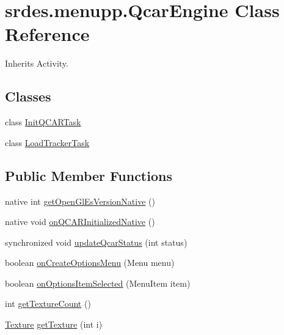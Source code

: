 \hypertarget{classsrdes_1_1menupp_1_1_qcar_engine}{\section{srdes.\-menupp.\-Qcar\-Engine \-Class \-Reference}
\label{classsrdes_1_1menupp_1_1_qcar_engine}
}


\-Inherits \-Activity.

\subsection*{\-Classes}
\begin{DoxyCompactItemize}
\item 
class \hyperlink{classsrdes_1_1menupp_1_1_qcar_engine_1_1_init_q_c_a_r_task}{\-Init\-Q\-C\-A\-R\-Task}
\item 
class \hyperlink{classsrdes_1_1menupp_1_1_qcar_engine_1_1_load_tracker_task}{\-Load\-Tracker\-Task}
\end{DoxyCompactItemize}
\subsection*{\-Public \-Member \-Functions}
\begin{DoxyCompactItemize}
\item 
native int \hyperlink{classsrdes_1_1menupp_1_1_qcar_engine_ae32972a9d037a8314efa5d9b10f91322}{get\-Open\-Gl\-Es\-Version\-Native} ()
\item 
native void \hyperlink{classsrdes_1_1menupp_1_1_qcar_engine_a7d7f6c6ffc71b592bd029510e17e2827}{on\-Q\-C\-A\-R\-Initialized\-Native} ()
\item 
synchronized void \hyperlink{classsrdes_1_1menupp_1_1_qcar_engine_ae47475c217413bc1377a6d6568132650}{update\-Qcar\-Status} (int status)
\item 
boolean \hyperlink{classsrdes_1_1menupp_1_1_qcar_engine_ae76faa2f48fbeb55adc43cb7b82d65c3}{on\-Create\-Options\-Menu} (\-Menu menu)
\item 
boolean \hyperlink{classsrdes_1_1menupp_1_1_qcar_engine_add28d14757941c02e895e8eda97f1d3d}{on\-Options\-Item\-Selected} (\-Menu\-Item item)
\item 
int \hyperlink{classsrdes_1_1menupp_1_1_qcar_engine_ae3b353842ddd6f7ba48dec17ef1e0c54}{get\-Texture\-Count} ()
\item 
\hyperlink{classsrdes_1_1menupp_1_1_texture}{\-Texture} \hyperlink{classsrdes_1_1menupp_1_1_qcar_engine_ad567808a0037e506d5574f0ab9fc41cc}{get\-Texture} (int i)
\end{DoxyCompactItemize}

